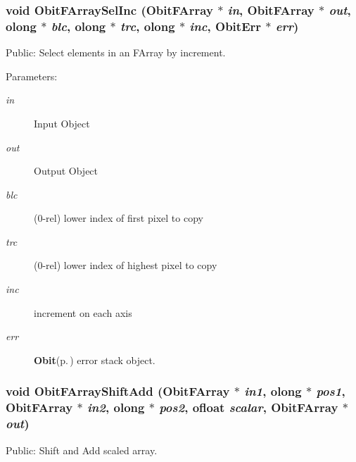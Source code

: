 \subsubsection{\setlength{\rightskip}{0pt plus 5cm}void Obit\-FArray\-Sel\-Inc ({\bf Obit\-FArray} $\ast$ {\em in}, {\bf Obit\-FArray} $\ast$ {\em out}, {\bf olong} $\ast$ {\em blc}, {\bf olong} $\ast$ {\em trc}, {\bf olong} $\ast$ {\em inc}, {\bf Obit\-Err} $\ast$ {\em err})}\label{ObitFArray_8c_a67}


Public: Select elements in an FArray by increment. 

\begin{Desc}
\item[Parameters:]
\begin{description}
\item[{\em in}]Input Object \item[{\em out}]Output Object \item[{\em blc}](0-rel) lower index of first pixel to copy \item[{\em trc}](0-rel) lower index of highest pixel to copy \item[{\em inc}]increment on each axis \item[{\em err}]{\bf Obit}{\rm (p.\,\pageref{structObit})} error stack object. \end{description}
\end{Desc}
\subsubsection{\setlength{\rightskip}{0pt plus 5cm}void Obit\-FArray\-Shift\-Add ({\bf Obit\-FArray} $\ast$ {\em in1}, {\bf olong} $\ast$ {\em pos1}, {\bf Obit\-FArray} $\ast$ {\em in2}, {\bf olong} $\ast$ {\em pos2}, {\bf ofloat} {\em scalar}, {\bf Obit\-FArray} $\ast$ {\em out})}\label{ObitFArray_8c_a64}


Public: Shift and Add scaled array. 

